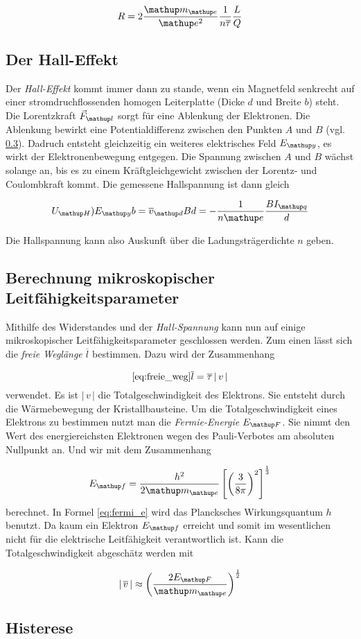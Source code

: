 \begin{equation}
\label{eq:wider}
R=2\frac{\map{m}\ua{e}}{\map{e}^2}\frac{1}{n\overline{\tau}}\frac{L}{Q}
\end{equation}
\subsection{Der Hall-Effekt}
Der \emph{Hall-Effekt} kommt immer dann zu stande, wenn 
ein Magnetfeld senkrecht auf einer stromdruchflossenden 
homogen Leiterplatte (Dicke $d$ und Breite $b$) steht.
Die Lorentzkraft $\vec{F}\ua{l}$ sorgt für eine Ablenkung der Elektronen.
Die Ablenkung bewirkt eine Potentialdifferenz zwischen den 
Punkten $A$ und $B$ (vgl. \ref{}). Dadruch entsteht gleichzeitig ein
weiteres elektrisches Feld $E\ua{y}$, es wirkt der Elektronenbewegung entgegen.
Die Spannung zwischen $A$ und $B$ wächst solange an, bis es zu einem Kräftgleichgewicht zwischen der Lorentz- und Coulombkraft kommt.
Die gemessene Hallspannung ist  dann gleich

\begin{equation}
\label{eq:hall_span}
U\ua{H})E\ua{y}b=\overline{v}\ua{d}Bd=-\frac{1}{n\map{e}}\frac{BI\ua{q}}{d}
\end{equation}

Die Hallspannung kann also Auskunft über die Ladungsträgerdichte $n$ geben.

\subsection{Berechnung mikroskopischer Leitfähigkeitsparameter}
Mithilfe des Widerstandes und der \emph{Hall-Spannung} kann nun auf 
einige mikroskopischer Leitfähigkeitsparameter geschlossen werden.
Zum einen lässt sich die \emph{freie Weglänge} $\overline{l}$ bestimmen.
Dazu wird der Zusammenhang

\begin{equation}
\ref{eq:freie_weg}
\overline{l}=\overline{\tau}\left|\,v\,\right|
\end{equation}
verwendet.
Es ist $\left|\,v\,\right|$ die Totalgeschwindigkeit des Elektrons.
Sie entsteht durch die Wärmebewegung der Kristallbausteine.
Um die Totalgeschwindigkeit eines Elektrons zu bestimmen nutzt 
man die \emph{Fermie-Energie} $E\ua{F}$. Sie nimmt den Wert des energiereichsten Elektronen wegen des 
Pauli-Verbotes am absoluten Nullpunkt an.
Und wir mit dem Zusammenhang 

\begin{equation}
\label{eq:fermi_e}
E\ua{f}=\frac{h^2}{2\map{m}\ua{e}}\left[\left(\frac{3}{8\pi}\right)^2\right]^{\frac{1}{3}}
\end{equation}
berechnet. In Formel \eqref{eq:fermi_e} wird das Plancksches Wirkungsquantum $h$ benutzt.
Da kaum ein Elektron $E\ua{f}$ erreicht und somit im wesentlichen nicht 
für die elektrische Leitfähigkeit verantwortlich ist.
Kann die Totalgeschwindigkeit abgeschätz werden mit

\begin{equation}
\label{eq:total_v}
\left|\,\overline{v}\,\right|\approx\left(\frac{2E\ua{F}}{\map{m}\ua{e}}\right)^{\frac{1}{2}}
\end{equation}
\subsection{Histerese}
